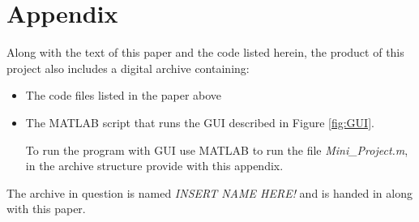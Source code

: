 \documentclass[Appendix]{subfiles}
\begin{document}
\chapter{Appendix}
Along with the text of this paper and the code listed herein, the product of this project also includes a digital archive containing:

\begin{itemize}
\item
The code files listed in the paper above

\item
The MATLAB script that runs the GUI described in Figure \ref{fig:GUI}.

	\subitem
	To run the program with GUI use MATLAB to run the file \textit{Mini\_Project.m}, in the archive structure provide with this appendix.

\end{itemize}

The archive in question is named \textit{INSERT NAME HERE!} and is handed in along with this paper.
\end{document}
